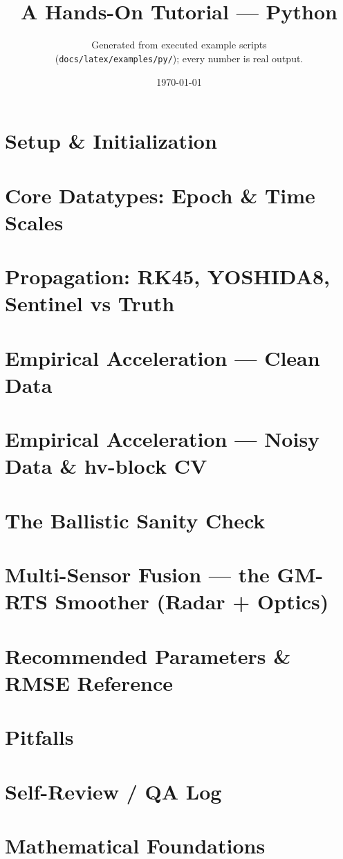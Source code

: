 \documentclass[11pt]{report}
\title{\Huge\Ballistic\\[4pt]\Large A Hands-On Tutorial --- Python}
\author{Generated from executed example scripts\\
  (\texttt{docs/latex/examples/py/}); every number is real output.}
\date{\today}
\begin{document}
\maketitle
\tableofcontents

\chapter{Setup \& Initialization}
\chapter{Core Datatypes: Epoch \& Time Scales}
\chapter{Propagation: RK45, YOSHIDA8, Sentinel vs Truth}
\chapter{Empirical Acceleration --- Clean Data}
\chapter{Empirical Acceleration --- Noisy Data \& hv-block CV}
\chapter{The Ballistic Sanity Check}
\chapter{Multi-Sensor Fusion --- the GM-RTS Smoother (Radar + Optics)}
\chapter{Recommended Parameters \& RMSE Reference}
\chapter{Pitfalls}
\chapter{Self-Review / QA Log}
\chapter{Mathematical Foundations}

\end{document}
